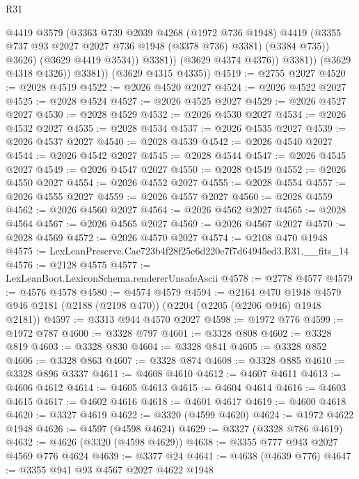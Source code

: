 \begin{lexlean}{R31}
\begin{coremodule}
                          @4419
                          @3579
                          (@3363
                            @739
                            @2039
                            @4268
                            (@1972 @736 @1948)
                            @4419
                            (@3355 @737 @93 @2027 @2027 @736 @1948 (@3378 @736) @3381)
                            (@3384 @735))
                          @3626)
                        (@3629 @4419 @3534))
                      @3381))
                  (@3629 @4374 @4376))
                @3381))
            (@3629 @4318 @4326))
          @3381))
      (@3629 @4315 @4335))
@4519 := @2755 @2027
@4520 := @2028 @4519
@4522 := @2026 @4520 @2027
@4524 := @2026 @4522 @2027
@4525 := @2028 @4524
@4527 := @2026 @4525 @2027
@4529 := @2026 @4527 @2027
@4530 := @2028 @4529
@4532 := @2026 @4530 @2027
@4534 := @2026 @4532 @2027
@4535 := @2028 @4534
@4537 := @2026 @4535 @2027
@4539 := @2026 @4537 @2027
@4540 := @2028 @4539
@4542 := @2026 @4540 @2027
@4544 := @2026 @4542 @2027
@4545 := @2028 @4544
@4547 := @2026 @4545 @2027
@4549 := @2026 @4547 @2027
@4550 := @2028 @4549
@4552 := @2026 @4550 @2027
@4554 := @2026 @4552 @2027
@4555 := @2028 @4554
@4557 := @2026 @4555 @2027
@4559 := @2026 @4557 @2027
@4560 := @2028 @4559
@4562 := @2026 @4560 @2027
@4564 := @2026 @4562 @2027
@4565 := @2028 @4564
@4567 := @2026 @4565 @2027
@4569 := @2026 @4567 @2027
@4570 := @2028 @4569
@4572 := @2026 @4570 @2027
@4574 := @2108 @470 @1948
@4575 := LexLeanPreserve.Cae723b4f28f25c6d220e7f7d64945ed3.R31.__fits_14
@4576 := @2128 @4575
@4577 := LexLeanBoot.LexiconSchema.rendererUnsafeAscii
@4578 := @2778 @4577
@4579 := @4576 @4578
@4580 := @4574 @4579
@4594 := @2164
    @470
    @1948
    @4579
    @946
    @2181
    (@2188 (@2198 @470))
    (@2204 (@2205 (@2206 @946) @1948 @2181))
@4597 := @3313 @944 @4570 @2027
@4598 := @1972 @776
@4599 := @1972 @787
@4600 := @3328 @797
@4601 := @3328 @808
@4602 := @3328 @819
@4603 := @3328 @830
@4604 := @3328 @841
@4605 := @3328 @852
@4606 := @3328 @863
@4607 := @3328 @874
@4608 := @3328 @885
@4610 := @3328 @896 @3337
@4611 := @4608 @4610
@4612 := @4607 @4611
@4613 := @4606 @4612
@4614 := @4605 @4613
@4615 := @4604 @4614
@4616 := @4603 @4615
@4617 := @4602 @4616
@4618 := @4601 @4617
@4619 := @4600 @4618
@4620 := @3327 @4619
@4622 := @3320 (@4599 @4620)
@4624 := @1972 @4622 @1948
@4626 := @4597 (@4598 @4624)
@4629 := @3327 (@3328 @786 @4619)
@4632 := @4626 (@3320 (@4598 @4629))
@4638 := @3355 @777 @943 @2027 @4569 @776 @4624
@4639 := @3377 @24
@4641 := @4638 (@4639 @776)
@4647 := @3355 @941 @93 @4567 @2027 @4622 @1948

\end{coremodule}
\end{lexlean}

